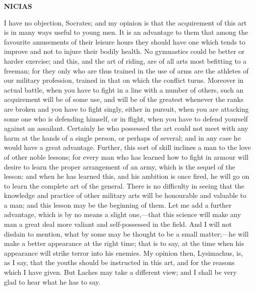 \documentclass[11pt,letter]{article}
\begin{document}
\par \textbf{NICIAS}
\par   I have no objection, Socrates; and my opinion is that the acquirement of this art is in many ways useful to young men. It is an advantage to them that among the favourite amusements of their leisure hours they should have one which tends to improve and not to injure their bodily health. No gymnastics could be better or harder exercise; and this, and the art of riding, are of all arts most befitting to a freeman; for they only who are thus trained in the use of arms are the athletes of our military profession, trained in that on which the conflict turns. Moreover in actual battle, when you have to fight in a line with a number of others, such an acquirement will be of some use, and will be of the greatest whenever the ranks are broken and you have to fight singly, either in pursuit, when you are attacking some one who is defending himself, or in flight, when you have to defend yourself against an assailant. Certainly he who possessed the art could not meet with any harm at the hands of a single person, or perhaps of several; and in any case he would have a great advantage. Further, this sort of skill inclines a man to the love of other noble lessons; for every man who has learned how to fight in armour will desire to learn the proper arrangement of an army, which is the sequel of the lesson:  and when he has learned this, and his ambition is once fired, he will go on to learn the complete art of the general. There is no difficulty in seeing that the knowledge and practice of other military arts will be honourable and valuable to a man; and this lesson may be the beginning of them. Let me add a further advantage, which is by no means a slight one,—that this science will make any man a great deal more valiant and self-possessed in the field. And I will not disdain to mention, what by some may be thought to be a small matter;—he will make a better appearance at the right time; that is to say, at the time when his appearance will strike terror into his enemies. My opinion then, Lysimachus, is, as I say, that the youths should be instructed in this art, and for the reasons which I have given. But Laches may take a different view; and I shall be very glad to hear what he has to say.
\end{document}
